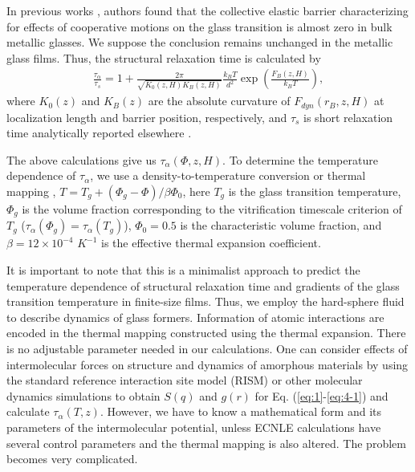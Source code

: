 \documentclass[twocolumn,preprintnumbers,amsmath,amssymb,superscriptaddress]{revtex4}
\begin{document}
In previous works \cite{45,9}, authors found that the collective elastic barrier characterizing for effects of cooperative motions on the glass transition is almost zero in bulk metallic glasses. We suppose the conclusion remains unchanged in the metallic glass films. Thus, the structural relaxation time is calculated by
\begin{eqnarray}
\frac{\tau_\alpha}{\tau_s} = 1+ \frac{2\pi}{\sqrt{K_0(z,H)K_B(z,H)}}\frac{k_BT}{d^2}\exp\left(\frac{F_B(z,H)}{k_BT} \right),
\label{eq:5}
\end{eqnarray}
where $K_0(z)$ and $K_B(z)$ are the absolute curvature of $F_{dyn}(r_B,z,H)$ at localization length and barrier position, respectively, and $\tau_s$ is short relaxation time analytically reported elsewhere \cite{2,7,10,6,35,42,11,61,62,44,45}.

The above calculations give us $\tau_\alpha(\Phi, z, H)$. To determine the temperature dependence of $\tau_\alpha$, we use a density-to-temperature conversion or thermal mapping \cite{45,9}, $T=T_g+(\Phi_g-\Phi)/\beta\Phi_0$, here $T_g$ is the glass transition temperature, $\Phi_g$ is the volume fraction corresponding to the vitrification timescale criterion of $T_g$ ($\tau_\alpha(\Phi_g)=\tau_\alpha(T_g)$), $\Phi_0=0.5$ is the characteristic volume fraction, and $\beta=12\times10^{-4}$ $K^{-1}$ is the effective thermal expansion coefficient. 

It is important to note that this is a minimalist approach to predict the temperature dependence of structural relaxation time and gradients of the glass transition temperature in finite-size films. Thus, we employ the hard-sphere fluid to describe dynamics of glass formers. Information of atomic interactions are encoded in the thermal mapping constructed using the thermal expansion. There is no adjustable parameter needed in our calculations. One can consider effects of intermolecular forces on structure and dynamics of amorphous materials by using the standard reference interaction site model (RISM) \cite{1} or other molecular dynamics simulations to obtain $S(q)$ and $g(r)$ for Eq. (\ref{eq:1}-\ref{eq:4-1}) and calculate $\tau_\alpha(T,z)$. However, we have to know a mathematical form and its parameters of the intermolecular potential, unless ECNLE calculations have several control parameters and the thermal mapping is also altered. The problem becomes very complicated.
\end{document}
